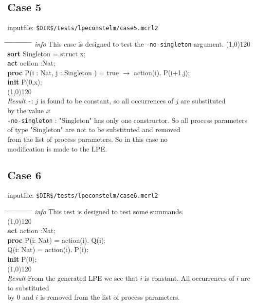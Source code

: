 \index{}\documentclass[a4paper,10pt]{article}
\theoremstyle{plain}
\theoremstyle{definition}
\newcommand{\pps}{process parameters}
\newcommand{\ti}{\textit}
\newcommand{\tb}{\textbf}
\newcommand{\tabw}{\hspace*{15.mm} \= \hspace*{20.mm} \= \hspace*{5.mm} \= \hspace*{5.mm} \= \hspace*{5.mm} \= \hspace*{5.mm}  \= \hspace*{5.mm}  \= \hspace*{5.mm}  \= \hspace*{5.mm} \= \hspace*{5.mm} \= \hspace*{5.mm}  \= \hspace*{5.mm}  \= \hspace*{5.mm}\kill}
\begin{document}
\subsection*{Case 5}
inputfile: \verb"$DIR$/tests/lpeconstelm/case5.mcrl2"
\begin{tabbing}
\tabw
\ti{info} \> This case is designed to test the \verb"-no-singleton" argument. 
\line(1,0){120}\\
\tb{sort} \> Singleton = struct x; \\
\tb{act}  \> action :Nat; \\
\tb{proc} \>  P(i : Nat, j : Singleton ) = true $\rightarrow$ action(i). P(i+1,j); \\
\tb{init} \>  P(0,x); \\
\line(1,0){120}\\
\ti{Result} \> 
\verb"-": \> \> $j$ is found to be constant, so all occurrences of $j$ are substituted  \\
\> \> \> by the value $x$\\
\> \verb"-no-singleton" : \> \> "Singleton" has only one constructor. So all \pps\  \\
\> \> \>                       of type "Singleton" are not to be substituted and removed  \\
\> \> \>                       from the list of \pps . So in this case no  \\
\> \> \>                       modification is made to the LPE.
\end{tabbing}
\newpage
\subsection*{Case 6}
inputfile: \verb"$DIR$/tests/lpeconstelm/case6.mcrl2"
\begin{tabbing}
\tabw
\ti{info} \> This test is designed to test some summands. \\
\line(1,0){120}\\
\tb{act} \> action :Nat;\\
\tb{proc} \> P(i: Nat) = \>  action(i). Q(i);\\
     \> \> Q(i: Nat) = action(i). P(i);\\

\tb{init} \> P(0);\\
\line(1,0){120}\\
\ti{Result} \> From the generated LPE we see that $i$ is constant. All occurrences of $i$ are to substituted \\
 \> by 0 and $i$ is removed from the list of \pps .
\end{tabbing}
\end{document}
